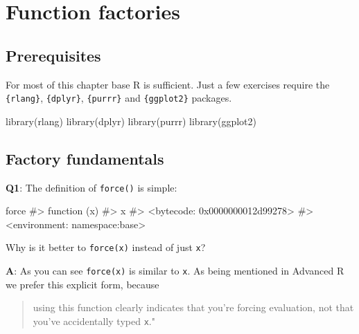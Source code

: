\documentclass[
]{krantz}
\makeatletter
\newenvironment{Shaded}{\begin{snugshade}}{\end{snugshade}}
\newcommand{\CommentTok}[1]{\textcolor[rgb]{0.56,0.35,0.01}{\textit{#1}}}
\newcommand{\KeywordTok}[1]{\textcolor[rgb]{0.13,0.29,0.53}{\textbf{#1}}}
\newcommand{\NormalTok}[1]{#1}
\newenvironment{kframe}{%
\medskip{}
\setlength{\fboxsep}{.8em}
 \def\at@end@of@kframe{}%
 \ifinner\ifhmode%
  \def\at@end@of@kframe{\end{minipage}}%
  \begin{minipage}{\columnwidth}%
 \fi\fi%
 \def\FrameCommand##1{\hskip\@totalleftmargin \hskip-\fboxsep
 \colorbox{shadecolor}{##1}\hskip-\fboxsep
     \hskip-\linewidth \hskip-\@totalleftmargin \hskip\columnwidth}%
 \MakeFramed {\advance\hsize-\width
   \@totalleftmargin\z@ \linewidth\hsize
   \@setminipage}}%
 {\par\unskip\endMakeFramed%
 \at@end@of@kframe}
\renewenvironment{Shaded}{\begin{kframe}}{\end{kframe}}
\renewcommand{\KeywordTok} [1]{\textcolor[rgb]{0.00,0.44,0.13}{{#1}}}
\renewcommand{\CommentTok} [1]{\textcolor[rgb]{0.38,0.63,0.69}{{#1}}}
\renewcommand{\NormalTok}  [1]{{#1}}
\makeatother
\begin{document}
\hypertarget{function-factories}{%
\chapter{Function factories}\label{function-factories}}

\hypertarget{prerequisites-4}{%
\section*{Prerequisites}\label{prerequisites-4}}


For most of this chapter base R is sufficient. Just a few exercises require the \texttt{\{rlang\}}, \texttt{\{dplyr\}}, \texttt{\{purrr\}} and \texttt{\{ggplot2\}} packages.

\begin{Shaded}
\begin{Highlighting}[]
\KeywordTok{library}\NormalTok{(rlang)}
\KeywordTok{library}\NormalTok{(dplyr)}
\KeywordTok{library}\NormalTok{(purrr)}
\KeywordTok{library}\NormalTok{(ggplot2)}
\end{Highlighting}
\end{Shaded}


\hypertarget{factory-fundamentals}{%
\section{Factory fundamentals}\label{factory-fundamentals}}

\textbf{{Q1}}: The definition of \texttt{force()} is simple:

\begin{Shaded}
\begin{Highlighting}[]
\NormalTok{force}
\CommentTok{#> function (x) }
\CommentTok{#> x}
\CommentTok{#> <bytecode: 0x0000000012d99278>}
\CommentTok{#> <environment: namespace:base>}
\end{Highlighting}
\end{Shaded}

Why is it better to \texttt{force(x)} instead of just \texttt{x}?

\textbf{{A}}: As you can see \texttt{force(x)} is similar to \texttt{x}. As being mentioned in Advanced R we prefer this explicit form, because

\begin{quote}
using this function clearly indicates that you're forcing evaluation, not that you've accidentally typed \texttt{x}."
\end{quote}
\end{document}
